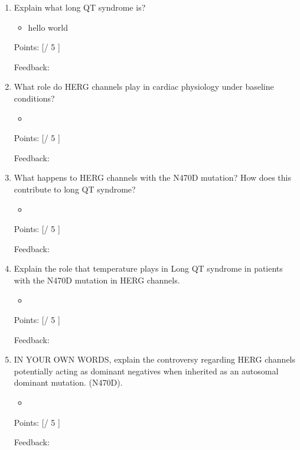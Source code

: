 \documentclass[basic,plain]{inVerba-notes}
\begin{document}
\begin{enumerate}\color{minimal}
    \item Explain what long QT syndrome is?
    \begin{itemize}\color{black}
        \item hello world
    \end{itemize}

    Points: [\quad / 5 ]

    Feedback: 

    \vspace*{40pt}

    \item What role do HERG channels play in cardiac physiology under baseline conditions? 
    \begin{itemize}\color{black}
        \item 
    \end{itemize}

    Points: [\quad / 5 ]

    Feedback: 

    \vspace*{40pt}
    
    \item What happens to HERG channels with the N470D mutation? How does this contribute to long QT syndrome? 
    \begin{itemize}\color{black}
        \item 
    \end{itemize}

    Points: [\quad / 5 ]

    Feedback: 

    \vspace*{40pt}
    \item Explain the role that temperature plays in Long QT syndrome in patients with the N470D mutation in HERG channels. 
    \begin{itemize}\color{black}
        \item 
    \end{itemize}

    Points: [\quad / 5 ]

    Feedback: 

    \vspace*{40pt}
    \item IN YOUR OWN WORDS, explain the controversy regarding HERG channels potentially acting as dominant negatives when inherited as an autosomal dominant mutation. (N470D).
    \begin{itemize}\color{black}
        \item 
    \end{itemize}

    Points: [\quad / 5 ]

    Feedback: 

    \vspace*{40pt}
\end{enumerate}
\end{document}
